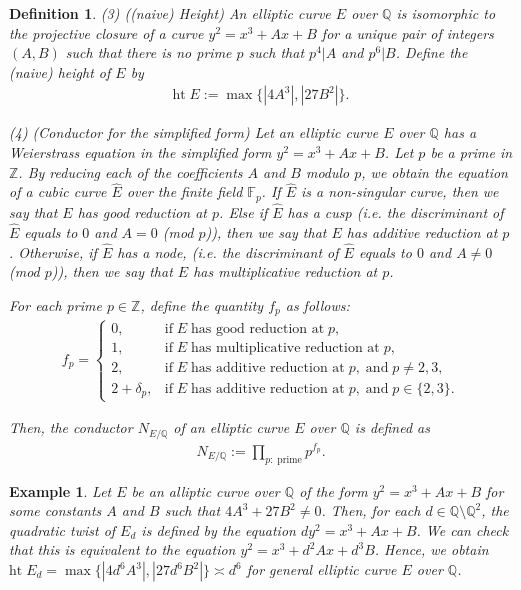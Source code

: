 \documentclass[12pt,reqno]{amsart}
\newtheorem{definition}[thm]{Definition}
\newtheorem{example}[thm]{Example}
\numberwithin{equation}{section}
\def\Z{{\mathbb Z}}
\def\Q{{\mathbb Q}}
\begin{document}
\begin{definition}
{\smallskip

(3) ((naive) Height) An elliptic curve $E$ over $\Q$ is isomorphic to the projective closure of a curve $y^2 = x^3 + Ax + B$ for a unique pair of integers $(A,B)$ such that there is no prime $p$ such that $p^4 | A$ and $p^6 | B$. Define the (naive) height of $E$ by
\begin{align*}
\text{ht} \; E:= \max \{|4A^3|, |27B^2|\}.
\end{align*}

\smallskip

(4) (Conductor for the simplified form) Let an elliptic curve $E$ over $\Q$ has a Weierstrass equation in the simplified form $y^2 = x^3 + Ax + B$. Let $p$ be a prime in $\Z$. By reducing each of the coefficients $A$ and $B$ modulo $p$, we obtain the equation of a cubic curve $\widehat{E}$ over the finite field $\mathbb{F}_p$. If $\widehat{E}$ is a non-singular curve, then we say that $E$ has good reduction at $p$. Else if $\widehat{E}$ has a cusp (i.e. the discriminant of $\widehat{E}$ equals to $0$ and $A = 0$ (mod $p$)), then we say that $E$ has additive reduction at $p$. Otherwise, if $\widehat{E}$ has a node,  (i.e. the discriminant of $\widehat{E}$ equals to $0$ and $A \neq 0$ (mod $p$)), then we say that $E$ has multiplicative reduction at $p$.

For each prime $p \in \Z$, define the quantity $f_p$ as follows:
\begin{align*}
f_p = \begin{cases}
0, & \mbox{if} \; E \; \text{has good reduction at} \; p, \\
1, & \mbox{if} \; E \; \text{has multiplicative reduction at} \; p, \\
2, & \mbox{if} \; E \; \text{has additive reduction at} \; p, \; \text{and} \; p \neq 2,3, \\
2+ \delta_p, & \mbox{if} \; E \; \text{has additive reduction at} \; p, \; \text{and} \; p \in \{2,3\}.
\end{cases}
\end{align*}

Then, the conductor $N_{E/\Q}$ of an elliptic curve $E$ over $\Q$ is defined as
\begin{align*}
N_{E/\Q} := \prod_{p: \; \text{prime}} p^{f_p}.
\end{align*}

}
\end{definition}

\begin{example}\label{htEd}
{\rm
 Let $E$ be an alliptic curve over $\Q$ of the form $y^2 = x^3 + Ax +B$ for some constants $A$ and $B$ such that $4A^3 + 27B^2 \neq 0$. Then, for each $d \in \Q \setminus \Q^2$, the quadratic twist of $E_d$ is defined by the equation $dy^2 = x^3 + Ax + B$. We can check that this is equivalent to the equation $y^2 = x^3 + d^2Ax + d^3B$. Hence, we obtain $\text{ht} \; E_d = \max \{ |4d^6A^3|, |27d^6B^2|\} \asymp d^6$ for general elliptic curve $E$ over $\Q$.
}
\end{example}
\vspace{2mm}
\end{document}
